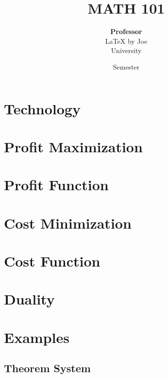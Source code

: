 \documentclass[oneside]{book}
\def\notetitle{MATH 101}
\def\noteauthor{
    \textbf{Professor} \\ 
    {\LaTeX} by Joe\\
    University}
\def\notedate{Semester}
\begin{document}
\title{\textbf{
    \LARGE{\notetitle} \vspace*{10\baselineskip}}
    }
\author{\noteauthor}
\date{\notedate}

\maketitle
\newpage

\tableofcontents
\newpage


\chapter{Technology}

\chapter{Profit Maximization}

\chapter{Profit Function}

\chapter{Cost Minimization}

\chapter{Cost Function}

\chapter{Duality}









\chapter{Examples} 

\section{Theorem System}
\end{document}
